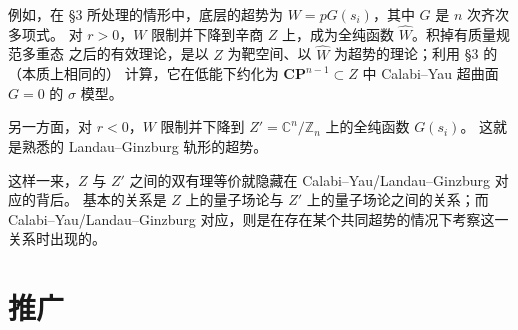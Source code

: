 
\label{op:49}

例如，在 §3 所处理的情形中，底层的超势为 $W=pG(s_i)$，其中 $G$ 是 $n$ 次齐次多项式。
对 $r>0$，$W$ 限制并下降到辛商 $Z$ 上，成为全纯函数 $\widehat{W}$。积掉有质量规范多重态
之后的有效理论，是以 $Z$ 为靶空间、以 $\widehat{W}$ 为超势的理论；利用 §3 的（本质上相同的）
计算，它在低能下约化为 $\mathbf{CP}^{n-1}\subset Z$ 中 Calabi--Yau 超曲面 $G=0$ 的 $\sigma$ 模型。

另一方面，对 $r<0$，$W$ 限制并下降到 $Z'=\mathbb{C}^n/\mathbb{Z}_n$ 上的全纯函数 $G(s_i)$。
这就是熟悉的 Landau--Ginzburg 轨形的超势。

这样一来，$Z$ 与 $Z'$ 之间的双有理等价就隐藏在 Calabi--Yau/Landau--Ginzburg 对应的背后。
基本的关系是 $Z$ 上的量子场论与 $Z'$ 上的量子场论之间的关系；而 Calabi--Yau/Landau--Ginzburg
对应，则是在存在某个共同超势的情况下考察这一关系时出现的。

\section{推广}

